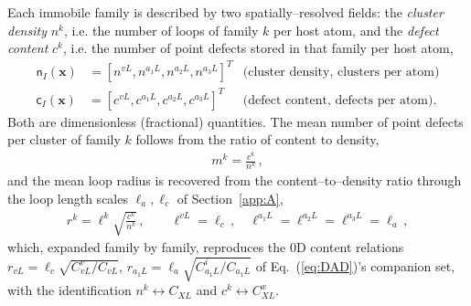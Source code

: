 \documentclass{article}
\newcommand{\spvec}[1]{\bm{\mathsf{#1}}}   %
\begin{document}
Each immobile family is described by two spatially--resolved fields: the \emph{cluster density} $n^k$, i.e. the number of loops of family $k$ per host atom, and the \emph{defect content} $c^k$, i.e. the number of point defects stored in that family per host atom,
\begin{align}
\spvec{n}_I(\bm x)&=\left[n^{vL},n^{a_1L},n^{a_2L},n^{a_3L}\right]^T & \text{(cluster density, clusters per atom)}\\
\spvec{c}_I(\bm x)&=\left[c^{vL},c^{a_1L},c^{a_2L},c^{a_3L}\right]^T & \text{(defect content, defects per atom).}
\end{align}
Both are dimensionless (fractional) quantities. The mean number of point defects per cluster of family $k$ follows from the ratio of content to density,
\begin{align}\label{eq:mI}
m^k=\frac{c^k}{n^k}\, ,
\end{align}
and the mean loop radius is recovered from the content--to--density ratio through the loop length scales $\ell_a,\ell_c$ of Section~\ref{app:A},
\begin{align}\label{eq:rI}
r^k=\ell^k\sqrt{\frac{c^k}{n^k}}\, ,\qquad \ell^{vL}=\ell_c\, ,\quad \ell^{a_1L}=\ell^{a_2L}=\ell^{a_3L}=\ell_a\, ,
\end{align}
which, expanded family by family, reproduces the $0$D content relations $r_{vL}=\ell_c\sqrt{C_{vL}^{v}/C_{vL}}$, $r_{a_1L}=\ell_a\sqrt{C_{a_1L}^{i}/C_{a_1L}}$ of Eq.~(\ref{eq:DAD})'s companion set, with the identification $n^k\leftrightarrow C_{XL}$ and $c^k\leftrightarrow C_{XL}^{x}$.
\end{document}
